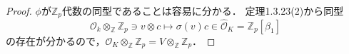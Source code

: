 \begin{proof}
  $\phi$が$\mathbb{Z}_p$代数の同型であることは容易に分かる．
  定理1.3.23(2)から同型
  \[ \mathcal{O}_k \otimes_\mathbb{Z} \mathbb{Z}_p \ni v \otimes c \mapsto \sigma(v)c \in \widehat{\mathcal{O}}_K = \mathbb{Z}_p[\beta_1] \]
  の存在が分かるので，$\mathcal{O}_K \otimes_\mathbb{Z} \mathbb{Z}_p = V \otimes_\mathbb{Z} \mathbb{Z}_p$．
\end{proof}

